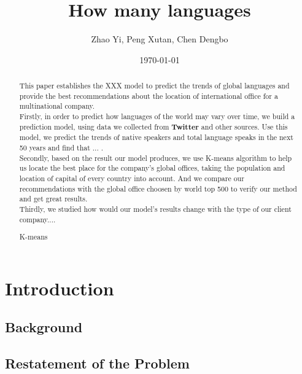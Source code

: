 \documentclass{mcmthesis}
\title {How many languages}
\author{Zhao Yi, Peng Xutan, Chen Dengbo}
\date{\today}
\begin{document}
\begin{abstract}

  \indent This paper establishes the XXX model to predict the trends of global languages and provide the best recommendations about the location of international office for a multinational company.\\
  \indent Firstly, in order to predict how languages of the world may vary over time, we build a prediction model, using data we collected from \textbf{Twitter} and other sources. Use this model, we predict the trends of native speakers and total language speaks in the next 50 years and find that ... .\\
  \indent Secondly, based on the result our model produces, we use K-means algorithm to help us locate the best place for the company's global offices, taking the population and location of capital of every country into account. And we compare our recommendations with the global office choosen by world top 500 to verify our method and get great results.\\
  \indent Thirdly, we studied how would our model's results change with the type of our client company....
\begin{keywords}
  K-means
\end{keywords}
\end{abstract}
\maketitle
\pagestyle{empty}
\newpage
\tableofcontents
\newpage
\pagestyle{fancy}
\setcounter{page}{1}
\section{Introduction}
\subsection{Background}
\subsection{Restatement of the Problem}
\end{document}
